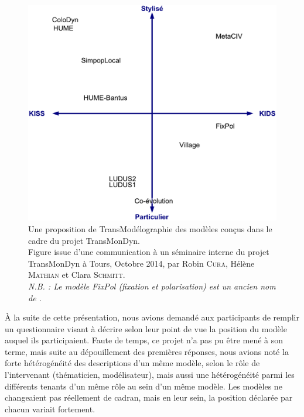 \begin{figure}[H]
	\centering
	\includegraphics[width=\linewidth]{img/transmodelographie.pdf}
	\caption[Une proposition de \og TransModélographie\fg{}.]{Une proposition de \og TransModélographie\fg{} des modèles conçus dans le cadre du projet TransMonDyn\footnotemark.\\
	Figure issue d'une communication à un séminaire interne du projet TransMonDyn à Tours, Octobre 2014, par Robin \textsc{Cura}, Hélène \textsc{Mathian} et Clara \textsc{Schmitt}.\\
	\textit{N.B. : Le modèle \og FixPol\fg{} (fixation et polarisation) est un ancien nom de \simfeodal{}.}}
	\label{fig:transmodelographie}
\end{figure}
\clearpage

À la suite de cette présentation, nous avions demandé aux participants de remplir un questionnaire visant à décrire selon leur point de vue la position du modèle auquel ils participaient.
Faute de temps, ce projet n'a pas pu être mené à son terme, mais suite au dépouillement des premières réponses, nous avions noté la forte hétérogénéité des descriptions d'un même modèle, selon le rôle de l'intervenant (thématicien, modélisateur), mais aussi une hétérogénéité parmi les différents tenants d'un même rôle au sein d'un même modèle.
Les modèles ne changeaient pas réellement de cadran, mais en leur sein, la position déclarée par chacun variait fortement.

